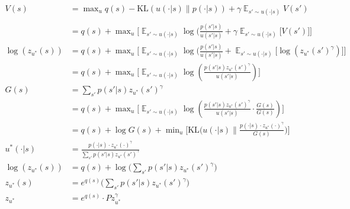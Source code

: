 \begin{align}
V(s) &= \mathop{\text{max}}_{u} q(s) - \text{KL}(u(\cdot| s) \parallel p(\cdot | s)) + \gamma \mathop{\mathbb E}_{s' \sim u(\cdot | s)} V(s') \tag{1}\\
\\
&= q(s) + \mathop{\text{max}}_{u} \bigg[ \mathop{\mathbb E}_{s' \sim u(\cdot | s)} \log(\frac{p(s' | s) }{ u(s' | s)}+\gamma \mathop{\mathbb E}_{s' \sim u(\cdot | s)} \big[V(s')\big] \bigg] \tag{2}\\
\log(z_{u^{* }}(s)) &= q(s) + \mathop{\text{max}}_{u} \bigg[ \mathop{\mathbb E}_{s' \sim u(\cdot | s)} \log(\frac{p(s' | s) }{ u(s' | s)}+\mathop{\mathbb E}_{s' \sim u(\cdot | s)} \big[\log(z_{u^{* }}(s')^{\gamma})\big] \bigg] \tag{3}\\
&= q(s) + \mathop{\text{max}}_{u} \bigg[ \mathop{\mathbb E}_{s' \sim u(\cdot | s)} \log(\frac{p(s' | s)z_{u^{* }}(s')^{\gamma} }{ u(s' | s)} ) \bigg] \tag{4}\\
G(s) &= \sum_{s'} p(s' | s) z_{u^{* }}(s')^{\gamma} \tag{5}\\
&= q(s) + \mathop{\text{max}}_{u} \bigg[ \mathop{\mathbb E}_{s' \sim u(\cdot | s)} \log(\frac{p(s' | s)z_{u^{* }}(s')^{\gamma} }{ u(s' | s)} \cdot \frac{G(s)}{G(s)} ) \bigg] \tag{6}\\
&= q(s) + \log G(s) + \mathop{\text{min}}_{u} \bigg[\text{KL}\big(u(\cdot | s) \parallel \frac{p(\cdot | s)\cdot z_{u^{* }}(\cdot)^{\gamma}}{G(s)} \big) \bigg] \tag{7}\\
u^{* }(\cdot | s) &= \frac{p(\cdot | s)\cdot z_{u^{* }}(\cdot)^{\gamma}}{\sum_{s'} p(s' | s) z_{u^{* }}(s')^{\gamma}} \tag{8}\\
\log(z_{u^{* }}(s)) &= q(s) + \log \big(\sum_{s'} p(s' | s) z_{u^{* }}(s')^{\gamma}\big) \tag{9}\\
z_{u^{* }}(s) &= e^{q(s)}\big(\sum_{s'} p(s' | s) z_{u^{* }}(s')^{\gamma}\big) \tag{10}\\
z_{u^{* }} &= e^{q(s)}\cdot P z_{u^{* }}^{\gamma} \tag{11}\\
\end{align}

